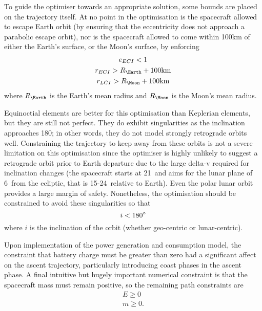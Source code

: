 To guide the optimiser towards an appropriate solution, some bounds are placed on the trajectory itself. At no point in the optimisation is the spacecraft allowed to escape Earth orbit (by ensuring that the eccentricity does not approach a parabolic escape orbit), nor is the spacecraft allowed to come within 100km of either the Earth's surface, or the Moon's surface, by enforcing
\begin{gather}
e_{ECI}<1 \\
r_{ECI}>R_\Earth+100\text{km} \\
r_{LCI}>R_\Moon+100\text{km} 
\end{gather}
where $R_\Earth$ is the Earth's mean radius and $R_\Moon$ is the Moon's mean radius.

Equinoctial elements are better for this optimisation than Keplerian elements, but they are still not perfect. They do exhibit singularities as the inclination approaches 180\degrees; in other words, they do not model strongly retrograde orbits well. Constraining the trajectory to keep away from these orbits is not a severe limitation on this optimisation since the optimiser is highly unlikely to suggest a retrograde orbit prior to Earth departure due to the large delta-v required for inclination changes (the spacecraft starts at 21\degrees\ and aims for the lunar plane of 6\degrees\ from the ecliptic, that is 15-24\degrees\ relative to Earth). Even the polar lunar orbit provides a large margin of safety. Nonetheless, the optimisation should be constrained to avoid these singularities so that
\begin{equation}
i<180^\circ
\end{equation}
where $i$ is the inclination of the orbit (whether geo-centric or lunar-centric).

Upon implementation of the power generation and consumption model, the constraint that battery charge must be greater than zero had a significant affect on the ascent trajectory, particularly introducing coast phases in the ascent phase. A final intuitive but hugely important numerical constraint is that the spacecraft mass must remain positive, so the remaining path constraints are %
\begin{gather}
E\ge0\\
m\ge0.
\end{gather}

